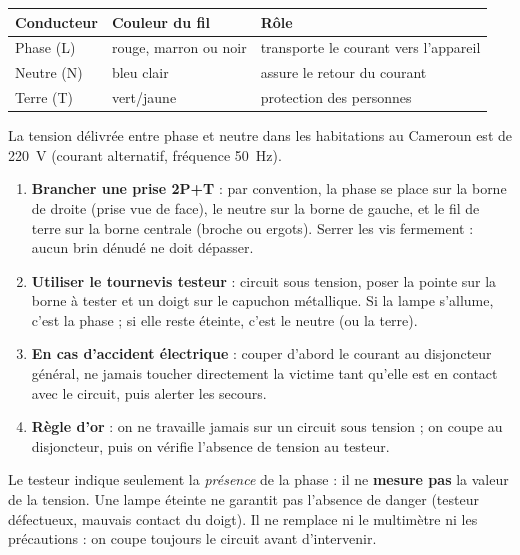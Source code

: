 \documentclass[11pt]{article}
\begin{document}
\begin{aretenir}
\begin{center}
\begin{tabularx}{\linewidth}{|l|X|X|}\hline
\rowcolor{popblueL} \textbf{Conducteur} & \textbf{Couleur du fil} & \textbf{Rôle} \\ \hline
Phase (L) & rouge, marron ou noir & transporte le courant vers l'appareil \\ \hline
Neutre (N) & bleu clair & assure le retour du courant \\ \hline
Terre (T) & vert/jaune & protection des personnes \\ \hline
\end{tabularx}
\end{center}
La tension délivrée entre phase et neutre dans les habitations au Cameroun est de \SI{220}{V} (courant alternatif, fréquence \SI{50}{Hz}).
\end{aretenir}

\begin{methode}
\begin{enumerate}
  \item \textbf{Brancher une prise 2P+T} : par convention, la phase se place sur la borne de droite (prise vue de face), le neutre sur la borne de gauche, et le fil de terre sur la borne centrale (broche ou ergots). Serrer les vis fermement : aucun brin dénudé ne doit dépasser.
  \item \textbf{Utiliser le tournevis testeur} : circuit sous tension, poser la pointe sur la borne à tester et un doigt sur le capuchon métallique. Si la lampe s'allume, c'est la phase ; si elle reste éteinte, c'est le neutre (ou la terre).
  \item \textbf{En cas d'accident électrique} : couper d'abord le courant au disjoncteur général, ne jamais toucher directement la victime tant qu'elle est en contact avec le circuit, puis alerter les secours.
  \item \textbf{Règle d'or} : on ne travaille jamais sur un circuit sous tension ; on coupe au disjoncteur, puis on vérifie l'absence de tension au testeur.
\end{enumerate}
\end{methode}

\begin{attention}
Le testeur indique seulement la \emph{présence} de la phase : il ne \textbf{mesure pas} la valeur de la tension. Une lampe éteinte ne garantit pas l'absence de danger (testeur défectueux, mauvais contact du doigt). Il ne remplace ni le multimètre ni les précautions : on coupe toujours le circuit avant d'intervenir.
\end{attention}
\end{document}
